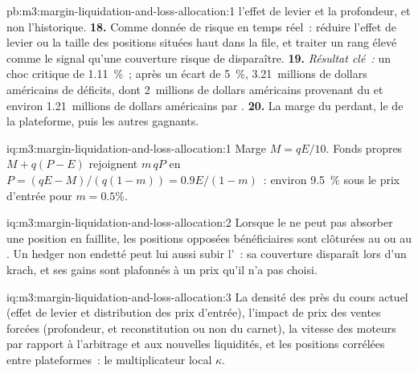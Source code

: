 \begin{solution}{pb:m3:margin-liquidation-and-loss-allocation:1}
l'effet de levier et la profondeur, et non l'historique. \textbf{18.} Comme donnée de risque en temps réel~: réduire l'effet de levier ou la taille des positions situées haut dans la
file, et traiter un rang élevé comme le signal qu'une couverture risque de disparaître. \textbf{19.} \emph{Résultat clé~:} un choc critique de
1.11~\%~; après un écart de 5~\%, 3.21~millions de dollars américains de déficits, dont 2~millions de dollars américains provenant du  et environ 1.21~millions de dollars américains
par . \textbf{20.} La marge du perdant, le  de la plateforme, puis les autres gagnants.
\end{solution}

\begin{solution}{iq:m3:margin-liquidation-and-loss-allocation:1}
Marge $M = qE/10$. Fonds propres $M + q(P - E)$ rejoignent $m\,qP$ en $P = (qE - M)/(q(1 - m)) = 0.9E/(1 - m)$~: environ 9.5~\% sous le
prix d'entrée pour $m = 0.5\%$.
\end{solution}

\begin{solution}{iq:m3:margin-liquidation-and-loss-allocation:2}
Lorsque le  ne peut pas absorber une position en faillite, les positions opposées bénéficiaires sont clôturées au  ou au
. Un hedger non endetté peut lui aussi subir l'~: sa couverture disparaît lors d'un krach, et ses gains sont plafonnés à un prix
qu'il n'a pas choisi.
\end{solution}

\begin{solution}{iq:m3:margin-liquidation-and-loss-allocation:3}
La densité des  près du cours actuel (effet de levier et distribution des prix d'entrée), l'impact de prix des ventes forcées
(profondeur, et reconstitution ou non du carnet), la vitesse des moteurs par rapport à l'arbitrage et aux nouvelles liquidités, et les positions corrélées
entre plateformes~: le multiplicateur local $\kappa$.
\end{solution}

